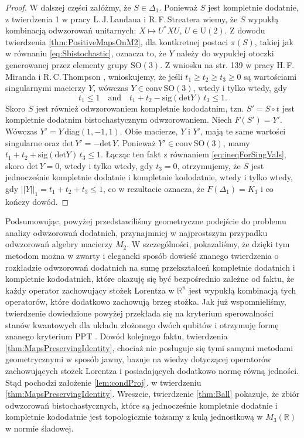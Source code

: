 \begin{proof}
W dalszej części załóżmy, że $S \in \Delta_{1}$.
Ponieważ $S$ jest kompletnie dodatnie,
z twierdzenia 1 w pracy L.\,J.\,Landaua i R.\,F.\,Streatera
\cite{landau1993birkhoff} wiemy, że
$S$ wypukłą kombinacją odwzorowań unitarnych:
$X \mapsto U^{*} X U$, $U \in \text{U}(2)$.
Z dowodu twierdzenia \ref{thm:PositiveMapsOnM2},
dla kontkretnej postaci $\pi(S)$, takiej jak w równaniu \eqref{eq:Sbistochastic},
oznacza to, że $Y$ należy do wypukłej otoczki generowanej przez elementy grupy $\text{SO}(3)$.
Z  wniosku na str. 139 w pracy H.\,F.\,Miranda i R.\,C.\,Thompson
\cite{miranda1994group},
wnioskujemy, że jeśli $t_{1} \geq t_{2} \geq t_{3} \geq 0$
są wartościami singularnymi macierzy $Y$,
wówczas $Y \in \text{conv} \, \text{SO}(3)$,
wtedy i tylko wtedy, gdy
\begin{equation}
\label{eq:ineqForSingVals}
t_{1} \leq 1
\quad \text{and} \quad
t_{1} + t_{2} - \text{sig} (\text{det} Y) \, t_{3} \leq 1.
\end{equation}
Skoro $S$ jest również odwzorowaniem kompletnie kododatnim, tzn.
$S' = S \circ t$ jest kompletnie dodatnim bistochastycznym odwzorowaniem.
Niech $F(S') = Y'$.
Wówczas $Y' = Y \, \text{diag} (1,-1,1)$.
Obie macierze, $Y$ i $Y'$, mają te same wartości singularne oraz
$\text{det} \, Y' = - \text{det} \, Y$.
Ponieważ $Y' \in  \text{conv} \, \text{SO}(3)$, mamy
$t_{1} + t_{2} + \text{sig} (\text{det} Y) \, t_{3} \leq 1$.
Łącząc ten fakt z równaniem \eqref{eq:ineqForSingVals},
skoro $\text{det} \, Y = 0$, wtedy i tylko wtedy, gdy  $t_{3} = 0$,
otrzymujemy, że $S$ jest jednocześnie kompletnie dodatnie i kompletnie kododatnie,
wtedy i tylko wtedy, gdy
$||Y||_{1} = t_{1} + t_{2} + t_{3} \leq 1$,
co w rezultacie oznacza, że $F(\Delta_{1}) = K_{1}$
i co kończy dowód.
\end{proof}

Podsumowując, powyżej przedstawiliśmy geometryczne podejście do problemu
analizy odwzorowań dodatnich, przynajmniej w najprostszym przypadku odwzorowań
algebry macierzy $M_{2}$.
W szczególności,
pokazaliśmy, że dzięki tym metodom można w zwarty i elegancki sposób dowieść
znanego twierdzenia o rozkładzie odwzorowań dodatnich na sumę przekształceń
kompletnie dodatnich i kompletnie kododatnich,
które okazuję się być bezpośrednio zależne od faktu, że każdy operator
zachowujący stożek Lorentza w $\mathbb{R}^{n}$ jest wypukłą kombinacją tych
operatorów, które dodatkowo zachowują brzeg stożka.
Jak już wspomnieliśmy, twierdzenie dowiedzione powyżej
przekłada się na kryterium sperowalności stanów kwantowych dla układu
złożonego dwóch qubitów i otrzymuję formę znanego kryterium PPT
\cite{peres1996separability,horodecki1996separability}.
Dowód kolejnego faktu, twierdzenia \ref{thm:MapsPreservingIdentity},
chociaż nie posługuje się tymi samymi metodami geometrycznymi w sposób jawny,
bazuje na wiedzy dotyczącej operatorów zachowujących stożek Lorentza i posiadających
dodatkowo normę równą jedności.
Stąd pochodzi założenie \ref{lem:condProj}. w twierdzeniu \ref{thm:MapsPreservingIdentity}.
Wreszcie, twierdzenie \ref{thm:Ball} pokazuje, że zbiór odwzorowań bistochastycznych,
które są jednocześnie kompletnie dodatnie i kompletnie kododatnie jest
topologicznie tożsamy z kulą jednostkową w $M_{3}(\mathbb{R})$ w normie śladowej.


